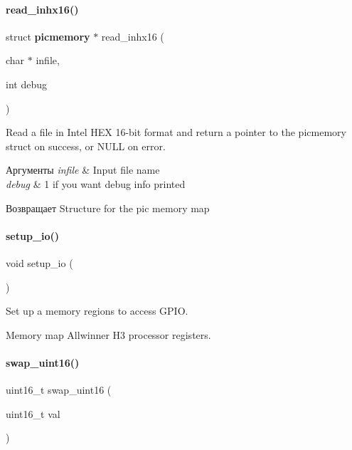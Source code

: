 \paragraph{read\+\_\+inhx16()}
{\footnotesize\ttfamily struct \textbf{ picmemory} $\ast$ read\+\_\+inhx16 (\begin{DoxyParamCaption}\item[{char $\ast$}]{infile,  }\item[{int}]{debug }\end{DoxyParamCaption})}



Read a file in Intel H\+EX 16-\/bit format and return a pointer to the picmemory struct on success, or N\+U\+LL on error. 


\begin{DoxyParams}{Аргументы}
{\em infile} & Input file name \\
\hline
{\em debug} & 1 if you want debug info printed\\
\hline
\end{DoxyParams}
\begin{DoxyReturn}{Возвращает}
Structure for the pic memory map 
\end{DoxyReturn}
\mbox{\label{rpp_8c_a085b31aea2b7dcfd097e79fba95d402d}} 
\paragraph{setup\+\_\+io()}
{\footnotesize\ttfamily void setup\+\_\+io (\begin{DoxyParamCaption}{ }\end{DoxyParamCaption})}



Set up a memory regions to access G\+P\+IO. 

Memory map Allwinner H3 processor registers. \mbox{\label{rpp_8c_a05184e440f8024c3963ca2110a4adcf5}} 
\paragraph{swap\+\_\+uint16()}
{\footnotesize\ttfamily uint16\+\_\+t swap\+\_\+uint16 (\begin{DoxyParamCaption}\item[{uint16\+\_\+t}]{val }\end{DoxyParamCaption})}



